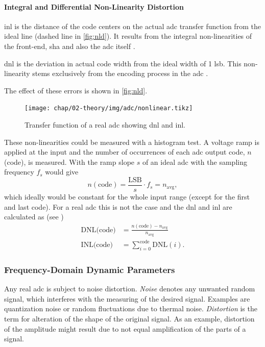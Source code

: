 
\paragraph{Integral and Differential Non-Linearity Distortion} 
\gls{inl} is the distance of the code centers on the actual \gls{adc} transfer function from the ideal line (dashed line in \autoref{fig:nld}). %
It results from the integral non-linearities of the front-end, \gls{sha} and also the \gls{adc} itself \cite{walt, Lundberg}. 

\gls{dnl} is the deviation in actual code width from the ideal width of 1 \gls{lsb}. This non-linearity stems exclusively from the encoding process in the \gls{adc} \cite{Lundberg,walt} . 

The effect of these errors is shown in \autoref{fig:nld}.
\begin{figure}[tb]
	\centering
	\texttt{[image: chap/02-theory/img/adc/nonlinear.tikz]}
	\caption[ADC Nonlinearities]{Transfer function of a real \gls{adc} showing \gls{dnl} and \gls{inl}.\cite{Lundberg}}
	\label{fig:nld}
\end{figure}

These non-linearities could be measured with a histogram test.
A voltage ramp is applied at the input and the number of occurrences of each \gls{adc} output code, $n$(code), is measured.
With the ramp slope $s$ of an ideal \gls{adc} with the sampling frequency $f_s$ would give
\begin{equation}
	n(\text{code}) = \frac{\text{LSB}}{s} \cdot f_s = n_\text{avg},
\end{equation}
which ideally would be constant for the whole input range (except for the first and last code).
For a real \gls{adc} this is not the case and the \gls{dnl} and \gls{inl} are calculated as (see \cite{inlDnl})
\begin{align}
	\text{DNL(code)} &= \frac{n(\text{code})-n_\text{avg}}{n_\text{avg}}\\
	\text{INL(code)} &= \sum_{i = 0}^{\text{code}} \text{DNL}(i).
\end{align}


\subsubsection{Frequency-Domain Dynamic Parameters}
Any real \gls{adc} is subject to noise distortion. 
\textit{Noise} denotes any unwanted random signal, which interferes with the measuring of the desired signal. 
Examples are quantization noise or random fluctuations due to thermal noise. 
\textit{Distortion} is the term for alteration of the shape of the original signal. 
As an example, distortion of the amplitude might result due to not equal amplification of the parts of a signal. \cite{nd}

